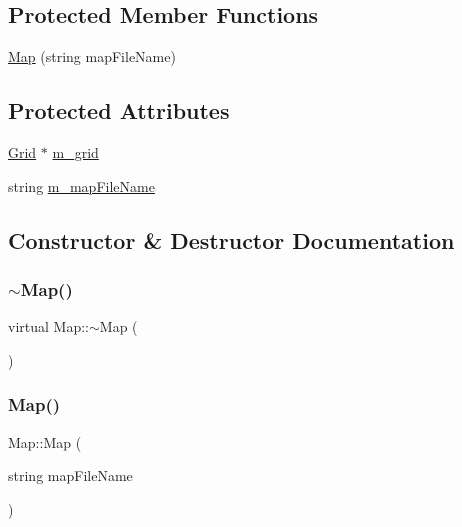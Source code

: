 \subsection*{Protected Member Functions}
\begin{DoxyCompactItemize}
\item 
\hyperlink{class_map_aa9b06672216e01d51b96cc4f70d3206d}{Map} (string map\+File\+Name)
\end{DoxyCompactItemize}
\subsection*{Protected Attributes}
\begin{DoxyCompactItemize}
\item 
\hyperlink{class_grid}{Grid} $\ast$ \hyperlink{class_map_a0fc16621dbe307d36170c3a96b24b7d9}{m\+\_\+grid}
\item 
string \hyperlink{class_map_a54e527b86ef517e67b299ef06233addc}{m\+\_\+map\+File\+Name}
\end{DoxyCompactItemize}


\subsection{Constructor \& Destructor Documentation}
\mbox{\label{class_map_ac1ab46138aa61acd0a58b1fd21e0df37}} 
\subsubsection{\texorpdfstring{$\sim$\+Map()}{~Map()}}
{\footnotesize\ttfamily virtual Map\+::$\sim$\+Map (\begin{DoxyParamCaption}{ }\end{DoxyParamCaption})\hspace{0.3cm}{\ttfamily [virtual]}}

\mbox{\label{class_map_aa9b06672216e01d51b96cc4f70d3206d}} 
\subsubsection{\texorpdfstring{Map()}{Map()}}
{\footnotesize\ttfamily Map\+::\+Map (\begin{DoxyParamCaption}\item[{string}]{map\+File\+Name }\end{DoxyParamCaption})\hspace{0.3cm}{\ttfamily [protected]}}



